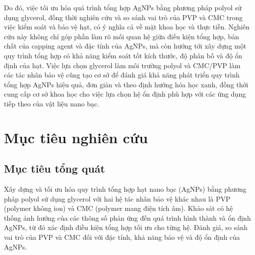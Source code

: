 \par
Do đó, việc tối ưu hóa quá trình tổng hợp AgNPs bằng phương pháp polyol sử dụng glycerol, đồng thời nghiên cứu và so sánh vai trò của PVP và CMC trong việc kiểm soát và bảo vệ hạt, có ý nghĩa cả về mặt khoa học và thực tiễn.
Nghiên cứu này không chỉ góp phần làm rõ mối quan hệ giữa điều kiện tổng hợp, bản chất của capping agent và đặc tính của AgNPs, mà còn hướng tới xây dựng một quy trình tổng hợp có khả năng kiểm soát tốt kích thước, độ phân bố và độ ổn định của hạt.
Việc lựa chọn glycerol làm môi trường polyol và CMC/PVP làm các tác nhân bảo vệ cũng tạo cơ sở để đánh giá khả năng phát triển quy trình tổng hợp AgNPs hiệu quả, đơn giản và theo định hướng hóa học xanh, đồng thời cung cấp cơ sở khoa học cho việc lựa chọn hệ ổn định phù hợp với các ứng dụng tiếp theo của vật liệu nano bạc.

\section{Mục tiêu nghiên cứu}
\subsection{Mục tiêu tổng quát}
Xây dựng và tối ưu hóa quy trình tổng hợp hạt nano bạc (AgNPs) bằng phương pháp polyol sử dụng glycerol với hai hệ tác nhân bảo vệ khác nhau là PVP (polymer không ion) và CMC (polymer mang điện tích âm). 
Khảo sát có hệ thống ảnh hưởng của các thông số phản ứng đến quá trình hình thành và ổn định AgNPs, từ đó xác định điều kiện tổng hợp tối ưu cho từng hệ. 
Đánh giá, so sánh vai trò của PVP và CMC đối với đặc tính, khả năng bảo vệ và độ ổn định của AgNPs.

